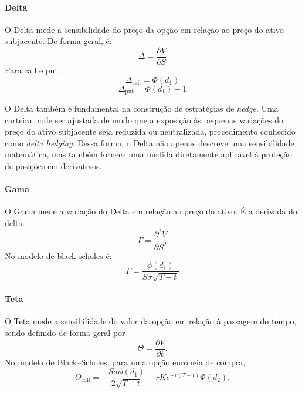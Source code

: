 \paragraph{Delta}

O Delta mede a sensibilidade do preço da opção em relação ao preço do ativo
subjacente. De forma geral, é: \begin{equation}
\Delta = \frac{\partial V}{\partial S}
\end{equation}
Para call e put:
\begin{equation}
\Delta_{\text{call}} = \Phi(d_1)
\end{equation}
\begin{equation}
\Delta_{\text{put}} = \Phi(d_1) - 1
\end{equation}

O Delta também é fundamental na construção de estratégias de
\textit{hedge}. Uma carteira pode ser ajustada de modo que a exposição às
pequenas variações do preço do ativo subjacente seja reduzida ou neutralizada,
procedimento conhecido como \textit{delta hedging}. Dessa forma, o Delta não
apenas descreve uma sensibilidade matemática, mas também fornece uma medida
diretamente aplicável à proteção de posições em derivativos.

\paragraph{Gama}

O Gama mede a variação do Delta em relação ao preço do ativo. É a derivada do delta. 
\begin{equation}
\Gamma = \frac{\partial^2 V}{\partial S^2}
\end{equation}
No modelo de black-scholes é:
\begin{equation}
\Gamma
=
\frac{\phi(d_1)}
{S\sigma\sqrt{T-t}}
\end{equation}
\paragraph{Teta}
O Teta mede a sensibilidade do valor da opção em relação à passagem
do tempo, sendo definido de forma geral por
\begin{equation}
\Theta = \frac{\partial V}{\partial t}.
\end{equation}
No modelo de Black--Scholes, para uma opção europeia de compra,
\begin{equation}
\Theta_{\text{call}}
=
-\frac{S\sigma\phi(d_1)}
{2\sqrt{T-t}}
-
rKe^{-r(T-t)}\Phi(d_2).
\end{equation}
